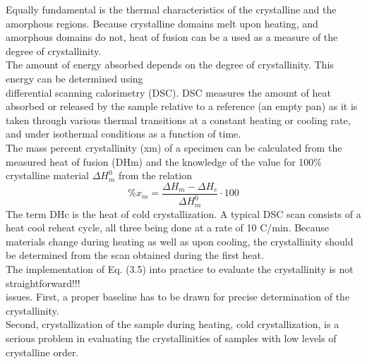 Equally fundamental is the thermal characteristics of the crystalline and the amorphous
regions. Because crystalline domains melt upon heating, and amorphous domains do
not, heat of fusion can be a used as a measure of the degree of crystallinity. \\
The amount of energy absorbed
depends on the degree of crystallinity. This energy can be determined using\\
differential scanning calorimetry (DSC). DSC measures the amount of heat absorbed
or released by the sample relative to a reference (an empty pan) as it is taken through
various thermal transitions at a constant heating or cooling rate, and under
isothermal conditions as a function of time.\\
The mass percent crystallinity (xm) of a specimen can be calculated from the
measured heat of fusion (DHm) and the knowledge of the value for 100\% crystalline
material $\Delta H^0_m$
from the relation
\[
\%x_m = \frac{\Delta H_m - \Delta H_c }{\Delta H^0_m}\cdot100
\]
The term DHc is the heat of cold crystallization. A typical DSC scan consists of a heat cool reheat cycle, all three being done at a rate of 10 C/min. Because materials
change during heating as well as upon cooling, the crystallinity should be determined
from the scan obtained during the first heat.\\
The implementation of Eq. (3.5)
into practice to evaluate the crystallinity is not straightforward!!!\\
issues. First, a proper baseline has to be drawn for precise determination of the crystallinity. \\
Second, crystallization of the sample during heating, cold crystallization,
is a serious problem in evaluating the crystallinities of samples with low
levels of crystalline order.\\

